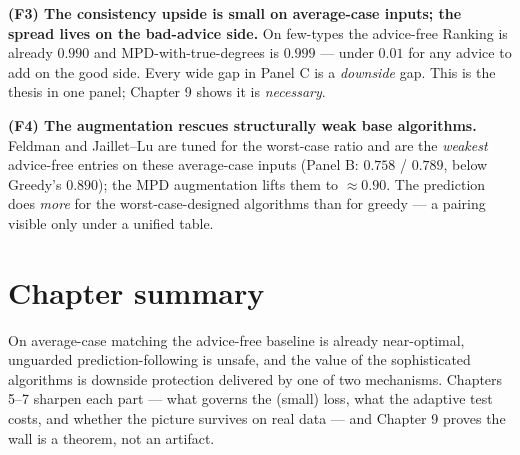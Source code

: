 \textbf{(F3) The consistency upside is small on average-case inputs; the spread lives on the
bad-advice side.} On few-types the advice-free Ranking is already \(0.990\) and
MPD-with-true-degrees is \(0.999\) --- under \(0.01\) for any advice to add on the good side.
Every wide gap in Panel C is a \emph{downside} gap. This is the thesis in one panel; Chapter 9
shows it is \emph{necessary}.

\textbf{(F4) The augmentation rescues structurally weak base algorithms.} Feldman and Jaillet--Lu
are tuned for the worst-case ratio and are the \emph{weakest} advice-free entries on these
average-case inputs (Panel B: \(0.758\) / \(0.789\), below Greedy's \(0.890\)); the MPD
augmentation lifts them to \(\approx0.90\). The prediction does \emph{more} for the
worst-case-designed algorithms than for greedy --- a pairing visible only under a unified
table.

\section{Chapter summary}\label{chapter-summary}

On average-case matching the advice-free baseline is already near-optimal, unguarded
prediction-following is unsafe, and the value of the sophisticated algorithms is downside
protection delivered by one of two mechanisms. Chapters 5--7 sharpen each part --- what governs
the (small) loss, what the adaptive test costs, and whether the picture survives on real
data --- and Chapter 9 proves the wall is a theorem, not an artifact.
